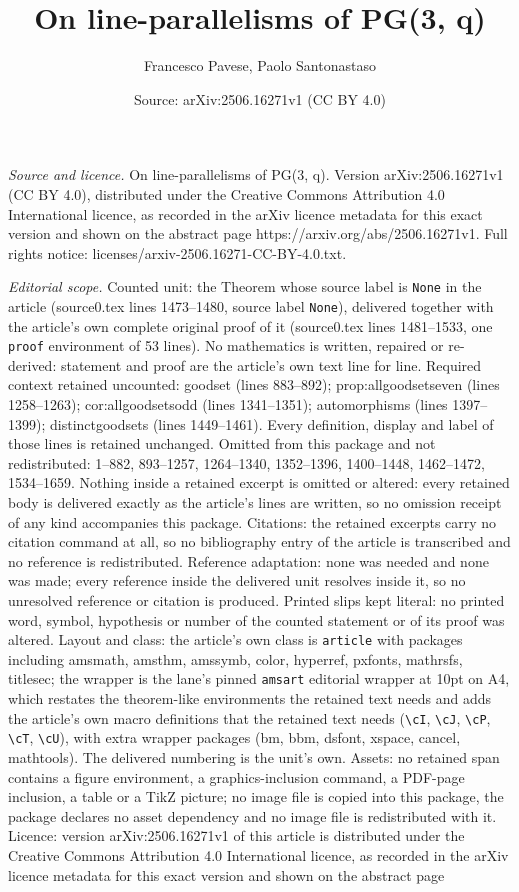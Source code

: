 \documentclass[10pt,a4paper]{amsart}
\title[On line-parallelisms of PG(3, q)]{On line-parallelisms of PG(3, q)}
\author{Francesco Pavese, Paolo Santonastaso}
\date{Source: arXiv:2506.16271v1 (CC BY 4.0)}
\begin{document}
\maketitle

\noindent\emph{Source and licence.} On line-parallelisms of PG(3, q). Version arXiv:2506.16271v1 (CC BY 4.0), distributed under the Creative Commons Attribution 4.0 International licence, as recorded in the arXiv licence metadata for this exact version and shown on the abstract page https://arxiv.org/abs/2506.16271v1. Full rights notice: licenses/arxiv-2506.16271-CC-BY-4.0.txt.\par\smallskip

\noindent\textit{Editorial scope.} Counted unit: the Theorem whose source label is \texttt{None} in the article (source0.tex lines 1473--1480, source label \texttt{None}), delivered together with the article's own complete original proof of it (source0.tex lines 1481--1533, one \texttt{proof} environment of 53 lines). No mathematics is written, repaired or re-derived: statement and proof are the article's own text line for line. Required context retained uncounted: goodset (lines 883--892); prop:allgoodsetseven (lines 1258--1263); cor:allgoodsetsodd (lines 1341--1351); automorphisms (lines 1397--1399); distinctgoodsets (lines 1449--1461). Every definition, display and label of those lines is retained unchanged. Omitted from this package and not redistributed: 1--882, 893--1257, 1264--1340, 1352--1396, 1400--1448, 1462--1472, 1534--1659. Nothing inside a retained excerpt is omitted or altered: every retained body is delivered exactly as the article's lines are written, so no omission receipt of any kind accompanies this package. Citations: the retained excerpts carry no citation command at all, so no bibliography entry of the article is transcribed and no reference is redistributed. Reference adaptation: none was needed and none was made; every reference inside the delivered unit resolves inside it, so no unresolved reference or citation is produced. Printed slips kept literal: no printed word, symbol, hypothesis or number of the counted statement or of its proof was altered. Layout and class: the article's own class is \texttt{article} with packages including amsmath, amsthm, amssymb, color, hyperref, pxfonts, mathrsfs, titlesec; the wrapper is the lane's pinned \texttt{amsart} editorial wrapper at 10pt on A4, which restates the theorem-like environments the retained text needs and adds the article's own macro definitions that the retained text needs (\texttt{\textbackslash cI}, \texttt{\textbackslash cJ}, \texttt{\textbackslash cP}, \texttt{\textbackslash cT}, \texttt{\textbackslash cU}), with extra wrapper packages (bm, bbm, dsfont, xspace, cancel, mathtools). The delivered numbering is the unit's own. Assets: no retained span contains a figure environment, a graphics-inclusion command, a PDF-page inclusion, a table or a TikZ picture; no image file is copied into this package, the package declares no asset dependency and no image file is redistributed with it. Licence: version arXiv:2506.16271v1 of this article is distributed under the Creative Commons Attribution 4.0 International licence, as recorded in the arXiv licence metadata for this exact version and shown on the abstract page 
\end{document}
